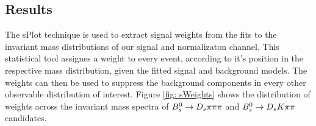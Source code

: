 %
%
%
%
% 

\subsection{Results}
\label{subsec:Results}

The sPlot technique \cite{Pivk:2004ty} is used to extract signal weights from the fits to the invariant mass distributions of our signal and normalizaton channel. 
This statistical tool assignes a weight to every event, according to it's position in the respective mass distribution, given the fitted signal and background models. 
The weights can then be used to suppress the background components in every other observable distribution of interest.  
Figure \ref{fig: sWeights} shows the distribution of weights across the invariant mass spectra of ${{B}^0_{s}}\rightarrow{\ensuremath{{D}_{s}}}{\ensuremath{\pi}}{\ensuremath{\pi}}{\ensuremath{\pi}}$ and ${{B}^0_{s}}\rightarrow{\ensuremath{{D}_{s}}}{\ensuremath{K}}{\ensuremath{\pi}}{\ensuremath{\pi}}$ candidates.


